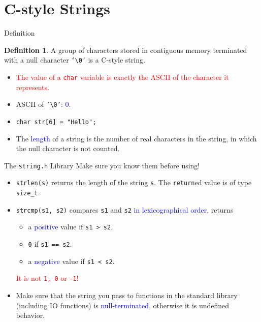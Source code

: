 \documentclass{beamer}
\newcommand{\red}[1]{\textcolor{red}{#1}}
\newcommand{\blue}[1]{\textcolor{blue}{#1}}
\newcommand{\ttt}[1]{\texttt{#1}}
\theoremstyle{definition}
\newtheorem{dfn}{Definition}
\begin{document}
\section{C-style Strings}

\begin{frame}{Definition}
    \begin{dfn}
        A group of characters stored in contiguous memory terminated with a null character \ttt{`\textbackslash 0'} is a C-style string.
    \end{dfn}
    \pause
    \begin{itemize}
        \item \red{The value of a \ttt{char} variable is exactly the ASCII of the character it represents.}
        \item ASCII of \ttt{`\textbackslash 0'}: \blue{0}.
        \item \ttt{char str[6] = "Hello";}
        \item The \blue{length} of a string is the number of real characters in the string, in which the null character is not counted.
    \end{itemize}
\end{frame}

\begin{frame}{The \ttt{string.h} Library}
    Make sure you know them before using!
    \begin{itemize}
        \item \ttt{strlen(s)} returns the length of the string \ttt{s}. The \ttt{return}ed value is of type \ttt{size\_t}.
        \pause
        \item \ttt{strcmp(s1, s2)} compares \ttt{s1} and \ttt{s2} \blue{in lexicographical order}, returns
        \begin{itemize}
            \item a \blue{positive} value if \ttt{s1 > s2}.
            \item \ttt{0} if \ttt{s1 == s2}.
            \item a \blue{negative} value if \ttt{s1 < s2}.
        \end{itemize}
        \red{It is not \ttt{1, 0} or \ttt{-1}!}
        \pause
        \item Make sure that the string you pass to functions in the standard library (including IO functions) is \blue{null-terminated}, otherwise it is undefined behavior.
    \end{itemize}
\end{frame}
\end{document}
